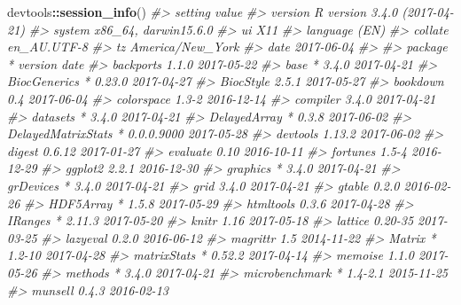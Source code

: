 \documentclass[]{book}
\newenvironment{Shaded}{\begin{snugshade}}{\end{snugshade}}
\newcommand{\KeywordTok}[1]{\textcolor[rgb]{0.13,0.29,0.53}{\textbf{#1}}}
\newcommand{\CommentTok}[1]{\textcolor[rgb]{0.56,0.35,0.01}{\textit{#1}}}
\newcommand{\OperatorTok}[1]{\textcolor[rgb]{0.81,0.36,0.00}{\textbf{#1}}}
\newcommand{\NormalTok}[1]{#1}
\begin{document}
\begin{Shaded}
\begin{Highlighting}[]
\NormalTok{devtools}\OperatorTok{::}\KeywordTok{session_info}\NormalTok{()}
\CommentTok{#>  setting  value                       }
\CommentTok{#>  version  R version 3.4.0 (2017-04-21)}
\CommentTok{#>  system   x86_64, darwin15.6.0        }
\CommentTok{#>  ui       X11                         }
\CommentTok{#>  language (EN)                        }
\CommentTok{#>  collate  en_AU.UTF-8                 }
\CommentTok{#>  tz       America/New_York            }
\CommentTok{#>  date     2017-06-04                  }
\CommentTok{#> }
\CommentTok{#>  package            * version    date      }
\CommentTok{#>  backports            1.1.0      2017-05-22}
\CommentTok{#>  base               * 3.4.0      2017-04-21}
\CommentTok{#>  BiocGenerics       * 0.23.0     2017-04-27}
\CommentTok{#>  BiocStyle            2.5.1      2017-05-27}
\CommentTok{#>  bookdown             0.4        2017-06-04}
\CommentTok{#>  colorspace           1.3-2      2016-12-14}
\CommentTok{#>  compiler             3.4.0      2017-04-21}
\CommentTok{#>  datasets           * 3.4.0      2017-04-21}
\CommentTok{#>  DelayedArray       * 0.3.8      2017-06-02}
\CommentTok{#>  DelayedMatrixStats * 0.0.0.9000 2017-05-28}
\CommentTok{#>  devtools             1.13.2     2017-06-02}
\CommentTok{#>  digest               0.6.12     2017-01-27}
\CommentTok{#>  evaluate             0.10       2016-10-11}
\CommentTok{#>  fortunes             1.5-4      2016-12-29}
\CommentTok{#>  ggplot2              2.2.1      2016-12-30}
\CommentTok{#>  graphics           * 3.4.0      2017-04-21}
\CommentTok{#>  grDevices          * 3.4.0      2017-04-21}
\CommentTok{#>  grid                 3.4.0      2017-04-21}
\CommentTok{#>  gtable               0.2.0      2016-02-26}
\CommentTok{#>  HDF5Array          * 1.5.8      2017-05-29}
\CommentTok{#>  htmltools            0.3.6      2017-04-28}
\CommentTok{#>  IRanges            * 2.11.3     2017-05-20}
\CommentTok{#>  knitr                1.16       2017-05-18}
\CommentTok{#>  lattice              0.20-35    2017-03-25}
\CommentTok{#>  lazyeval             0.2.0      2016-06-12}
\CommentTok{#>  magrittr             1.5        2014-11-22}
\CommentTok{#>  Matrix             * 1.2-10     2017-04-28}
\CommentTok{#>  matrixStats        * 0.52.2     2017-04-14}
\CommentTok{#>  memoise              1.1.0      2017-05-26}
\CommentTok{#>  methods            * 3.4.0      2017-04-21}
\CommentTok{#>  microbenchmark     * 1.4-2.1    2015-11-25}
\CommentTok{#>  munsell              0.4.3      2016-02-13}

\end{Highlighting}
\end{Shaded}
\end{document}
